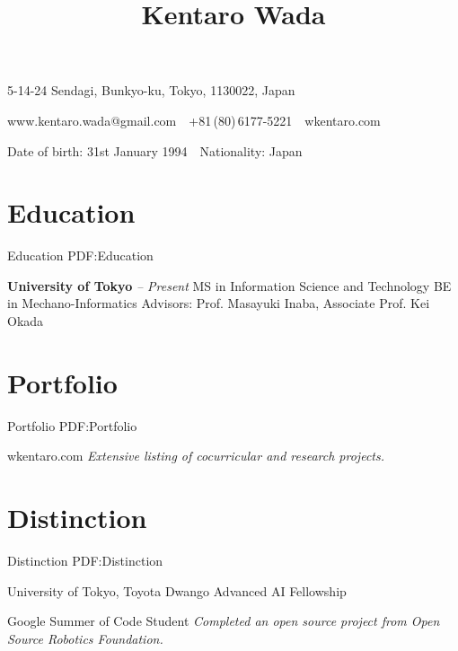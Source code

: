 \documentclass[letterpaper,MMMyyyy,nonstop]{simpleresumecv}
\newcommand{\CVAuthor}{Kentaro Wada}
\newcommand{\CVWebpage}{wkentaro.com}
\begin{document}

\title{\CVAuthor}

\begin{subtitle}
5-14-24 Sendagi, Bunkyo-ku, Tokyo, 1130022, Japan
\par
www.kentaro.wada@gmail.com
\,\SubBulletSymbol\,
+81\,(80)\,6177-5221
\,\SubBulletSymbol\,
\CVWebpage
\par
Date of birth: 31st January 1994
\,\SubBulletSymbol\,
Nationality: Japan

\noindent\makebox[\linewidth]{\rule{0.8\paperwidth}{0.4pt}}
\end{subtitle}

\begin{body}


\section
{Education}
{Education}
{PDF:Education}

\textbf{University of Tokyo}
\hfill
{\it {} -- Present}
\newline
MS in Information Science and Technology
\newline
BE in Mechano-Informatics
\newline
Advisors: Prof. Masayuki Inaba, Associate Prof. Kei Okada


\section
{Portfolio}
{Portfolio}
{PDF:Portfolio}

\CVWebpage
\newline
{\it Extensive listing of cocurricular and research projects.}


\section
{Distinction}
{Distinction}
{PDF:Distinction}

University of Tokyo, Toyota Dwango Advanced AI Fellowship
\hfill
{\it {}}

\BigGapNoBreak

Google Summer of Code Student
\hfill
{\it {}}
\newline
{\it Completed an open source project from Open Source Robotics Foundation.}


\end{body}
\end{document}
